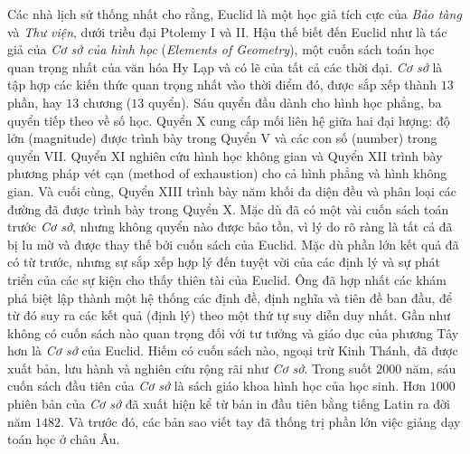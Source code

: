 \begin{multicols}{2}
	Các nhà lịch sử thống nhất cho rằng, Euclid là một học giả tích cực của \textit{Bảo tàng} và \textit{Thư viện}, dưới triều đại Ptolemy I và II. 
	\vskip 0.1cm
	Hậu thế biết đến Euclid như là tác giả của \textit{Cơ sở của hình học} (\textit{Elements of Geometry}), một cuốn sách toán học quan trọng nhất của văn hóa Hy Lạp và có lẽ của tất cả các thời đại. \textit{Cơ sở} là tập hợp các kiến thức quan trọng nhất vào thời điểm đó, được sắp xếp thành $13$ phần, hay $13$ chương ($13$ quyển). Sáu quyển đầu dành cho hình học phẳng, ba quyển tiếp theo về số học. Quyển X cung cấp mối liên hệ giữa hai đại lượng: độ lớn (magnitude) được trình bày trong Quyển V và các con số (number) trong quyển VII. Quyển XI nghiên cứu hình học không gian và Quyển XII trình bày phương pháp vét cạn (method of exhaustion) cho cả hình phẳng và hình không gian. Và cuối cùng, Quyển XIII trình bày năm khối đa diện đều và phân loại các đường đã được trình bày trong Quyển X.   
	\vskip 0.1cm
	Mặc dù đã có một vài cuốn sách toán trước \textit{Cơ sở}, nhưng không quyển nào được bảo  tồn, vì lý do rõ ràng là tất cả đã bị lu mờ và được thay thế bởi cuốn sách của Euclid.
	\vskip 0.1cm
	Mặc dù phần lớn kết quả đã có từ trước, nhưng sự sắp xếp hợp lý đến tuyệt vời của các định lý và sự phát triển của các sự kiện cho thấy thiên tài của Euclid. Ông đã hợp nhất các khám phá biệt lập thành một hệ thống các định đề, định nghĩa và tiên đề ban đầu, để từ đó suy ra các kết quả (định lý) theo một thứ tự suy diễn duy nhất.
	\vskip 0.1cm
	Gần như không có cuốn sách nào quan trọng đối với tư tưởng và giáo dục của phương Tây hơn là \textit{Cơ sở} của Euclid. Hiếm có cuốn sách nào, ngoại trừ Kinh Thánh, đã được xuất bản, lưu hành và nghiên cứu rộng rãi như \textit{Cơ sở}. Trong suốt $2000$ năm, sáu cuốn sách đầu tiên của \textit{Cơ sở} là  sách giáo khoa hình học của học sinh. Hơn $1000$ phiên bản của \textit{Cơ sở} đã xuất hiện kể từ bản in đầu tiên bằng tiếng Latin ra đời năm $1482$. Và trước đó, các bản sao viết tay đã thống trị phần lớn việc giảng dạy toán học ở châu Âu.
	\begin{figure}[H]
		\vspace*{-5pt}
		\centering
		\captionsetup{labelformat= empty, justification=centering}

\end{figure}
\end{multicols}
